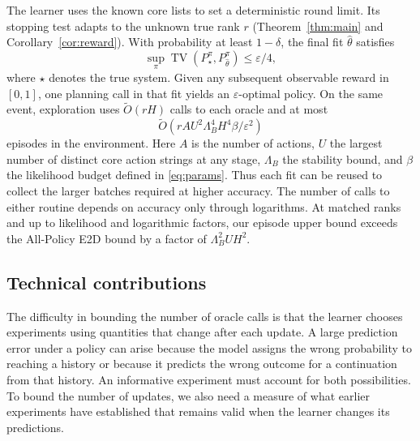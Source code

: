 \documentclass[sigconf,nonacm]{acmart}
\newcommand{\TV}{\operatorname{TV}}
\newcommand{\eps}{\varepsilon}
\newcommand{\softO}{\widetilde O}
\newcommand{\st}{\star}
\begin{document}
The learner uses the known core lists to set a deterministic round limit. Its stopping test adapts to the unknown true rank $r$ (Theorem~\ref{thm:main} and Corollary~\ref{cor:reward}). With probability at least $1-\delta$, the final fit $\widehat\theta$ satisfies
\[
             \sup_\pi\TV(P_\st^\pi,P_{\widehat\theta}^\pi)\le\eps/4,
\]
where $\star$ denotes the true system. Given any subsequent observable reward in $[0,1]$, one planning call in that fit yields an $\eps$-optimal policy. On the same event, exploration uses $\softO(rH)$ calls to each oracle and at most
\[
       \softO\!\left(r A U^2\Lambda_B^4 H^4\beta/\eps^2\right)
\]
episodes in the environment. Here $A$ is the number of actions, $U$ the largest number of distinct core action strings at any stage, $\Lambda_B$ the stability bound, and $\beta$ the likelihood budget defined in \eqref{eq:params}. Thus each fit can be reused to collect the larger batches required at higher accuracy. The number of calls to either routine depends on accuracy only through logarithms. At matched ranks and up to likelihood and logarithmic factors, our episode upper bound exceeds the All-Policy E2D bound by a factor of $\Lambda_B^2 U H^2$.

\subsection{Technical contributions}
The difficulty in bounding the number of oracle calls is that the learner chooses experiments using quantities that change after each update. A large prediction error under a policy can arise because the model assigns the wrong probability to reaching a history or because it predicts the wrong outcome for a continuation from that history. An informative experiment must account for both possibilities. To bound the number of updates, we also need a measure of what earlier experiments have established that remains valid when the learner changes its predictions.
\end{document}
